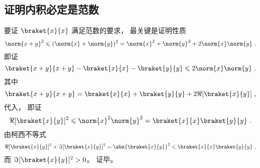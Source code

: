 \subsection{证明内积必定是范数}
要证 $\braket{x}{x}$ 满足范数的要求， 最关键是证明性质
\begin{equation}
\norm{x+y}^2 \leqslant (\norm{x} + \norm{y})^2 = \norm{x}^2 + \norm{y}^2 + 2\norm{x}\norm{y}~.
\end{equation}
即证
\begin{equation}
\braket{x+y}{x+y} - \braket{x}{x} - \braket{y}{y} \leqslant 2\norm{x}\norm{y}~.
\end{equation}
其中
\begin{equation}
\braket{x+y}{x+y} = \braket{x}{x} + \braket{y}{y} + 2\Re[{\braket{x}{y}}]~,
\end{equation}
代入， 即证
\begin{equation}\label{eq_InerPd_5}
\Re[{\braket{x}{y}}]^2 \leqslant \norm{x}^2\norm{y}^2 = \braket{x}{x}\braket{y}{y}~.
\end{equation}
由柯西不等式
\begin{equation}
\Re[\braket{x}{y}]^2 + \Im[\braket{x}{y}]^2 = \abs{\braket{x}{y}}^2 \leqslant \braket{x}{x}\braket{y}{y}~,
\end{equation}
而 $\Im[\braket{x}{y}]^2 > 0$。 证毕。
